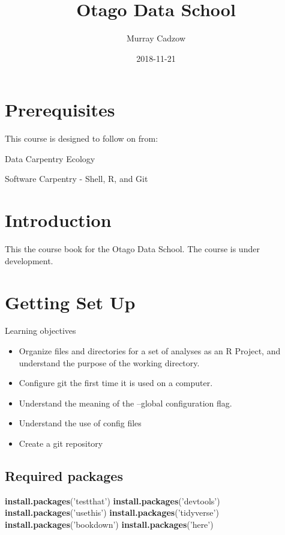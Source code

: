 \documentclass[]{book}
\title{Otago Data School}
\author{Murray Cadzow}
\date{2018-11-21}
\newenvironment{Shaded}{\begin{snugshade}}{\end{snugshade}}
\newcommand{\KeywordTok}[1]{\textcolor[rgb]{0.13,0.29,0.53}{\textbf{#1}}}
\newcommand{\NormalTok}[1]{#1}
\newcommand{\StringTok}[1]{\textcolor[rgb]{0.31,0.60,0.02}{#1}}
\providecommand{\tightlist}{%
  \setlength{\itemsep}{0pt}\setlength{\parskip}{0pt}}
\begin{document}
\maketitle

{
\setcounter{tocdepth}{1}
\tableofcontents
}
\hypertarget{prerequisites}{%
\chapter{Prerequisites}\label{prerequisites}}

This course is designed to follow on from:

Data Carpentry Ecology

Software Carpentry - Shell, R, and Git

\hypertarget{intro}{%
\chapter{Introduction}\label{intro}}

This the course book for the Otago Data School. The course is under
development.

\hypertarget{getting-set-up}{%
\chapter{Getting Set Up}\label{getting-set-up}}

Learning objectives

\begin{itemize}
\tightlist
\item
  Organize files and directories for a set of analyses as an R Project,
  and understand the purpose of the working directory.
\item
  Configure git the first time it is used on a computer.
\item
  Understand the meaning of the --global configuration flag.
\item
  Understand the use of config files
\item
  Create a git repository
\end{itemize}

\hypertarget{required-packages}{%
\section{Required packages}\label{required-packages}}

\begin{Shaded}
\begin{Highlighting}[]
\KeywordTok{install.packages}\NormalTok{(}\StringTok{'testthat'}\NormalTok{)}
\KeywordTok{install.packages}\NormalTok{(}\StringTok{'devtools'}\NormalTok{)}
\KeywordTok{install.packages}\NormalTok{(}\StringTok{'usethis'}\NormalTok{)}
\KeywordTok{install.packages}\NormalTok{(}\StringTok{'tidyverse'}\NormalTok{)}
\KeywordTok{install.packages}\NormalTok{(}\StringTok{'bookdown'}\NormalTok{)}
\KeywordTok{install.packages}\NormalTok{(}\StringTok{'here'}\NormalTok{)}
\end{Highlighting}
\end{Shaded}
\end{document}
